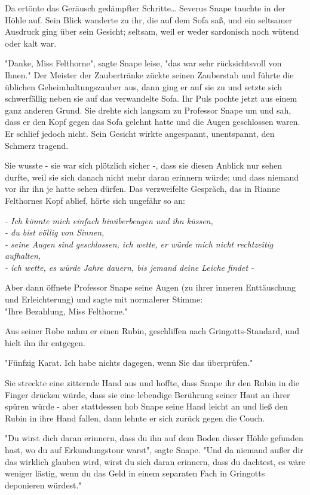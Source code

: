 {Da ertönte das Geräusch gedämpfter Schritte… Severus Snape tauchte in der Höhle auf. Sein Blick wanderte zu ihr, die auf dem Sofa saß, und ein seltsamer Ausdruck ging über sein Gesicht; seltsam, weil er weder sardonisch noch wütend oder kalt war.

"Danke, Miss Felthorne", sagte Snape leise, "das war sehr rücksichtsvoll von Ihnen." Der Meister der Zaubertränke zückte seinen Zauberstab und führte die üblichen Geheimhaltungszauber aus, dann ging er auf sie zu und setzte sich schwerfällig neben sie auf das verwandelte Sofa. Ihr Puls pochte jetzt aus einem ganz anderen Grund. Sie drehte sich langsam zu Professor Snape um und sah, dass er den Kopf gegen das Sofa gelehnt hatte und die Augen geschlossen waren. Er schlief jedoch nicht. Sein Gesicht wirkte angespannt, unentspannt, den Schmerz tragend.

Sie wusste - sie war sich plötzlich sicher -, dass sie diesen Anblick nur sehen durfte, weil sie sich danach nicht mehr daran erinnern würde; und dass niemand vor ihr ihn je hatte sehen dürfen. Das verzweifelte Gespräch, das in Rianne Felthornes Kopf ablief, hörte sich ungefähr so an:

\emph{- Ich könnte mich einfach hinüberbeugen und ihn küssen,}\\ \emph{- du bist völlig von Sinnen,}\\ \emph{- seine Augen sind geschlossen, ich wette, er würde mich nicht rechtzeitig aufhalten,\\ - ich wette, es würde Jahre dauern, bis jemand deine Leiche findet -}

Aber dann öffnete Professor Snape seine Augen (zu ihrer inneren Enttäuschung und Erleichterung) und sagte mit normalerer Stimme:\\ "Ihre Bezahlung, Miss Felthorne."

Aus seiner Robe nahm er einen Rubin, geschliffen nach Gringotts-Standard, und hielt ihn ihr entgegen.

"Fünfzig Karat. Ich habe nichts dagegen, wenn Sie das überprüfen."

Sie streckte eine zitternde Hand aus und hoffte, dass Snape ihr den Rubin in die Finger drücken würde, dass sie eine lebendige Berührung seiner Haut an ihrer spüren würde - aber stattdessen hob Snape seine Hand leicht an und ließ den Rubin in ihre Hand fallen, dann lehnte er sich zurück gegen die Couch.

"Du wirst dich daran erinnern, dass du ihn auf dem Boden dieser Höhle gefunden hast, wo du auf Erkundungstour warst", sagte Snape. "Und da niemand außer dir das wirklich glauben wird, wirst du sich daran erinnern, dass du dachtest, es wäre weniger lästig, wenn du das Geld in einem separaten Fach in Gringotts deponieren würdest."

}
